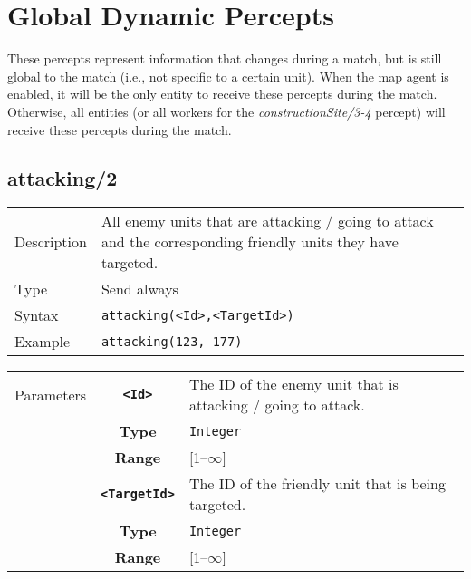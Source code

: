 \section{Global Dynamic Percepts}
These percepts represent information that changes during a match, but is still global to the match (i.e., not specific to a certain unit). When the map agent is enabled, it will be the only entity to receive these percepts during the match. Otherwise, all entities (or all workers for the \textit{constructionSite/3-4} percept) will receive these percepts during the match.

\subsection{attacking/2}
\begin{tabularx}{\textwidth}{lX}
 Description & All enemy units that are attacking / going to attack and the corresponding friendly units they have targeted. \\
 Type & Send always \\
 Syntax & \verb|attacking(<Id>,<TargetId>)| \\
 Example & \verb|attacking(123, 177)| \\
 \end{tabularx}
 \begin{tabularx}{\textwidth}{l | c | p{8cm}|}
 \cline{2-3}
 Parameters & \textbf{\verb|<Id>|} & The ID of the enemy unit that is attacking / going to attack. \\
            & \textbf{Type} & \verb|Integer| \\
            & \textbf{Range} & [1--$\infty$] \\
            \cline{2-3}
            & \textbf{\verb|<TargetId>|} & The ID of the friendly unit that is being targeted. \\
            & \textbf{Type} & \verb|Integer| \\
            & \textbf{Range} & [1--$\infty$] \\
            \cline{2-3}
\end{tabularx}

